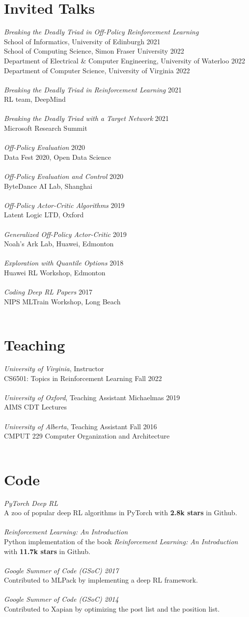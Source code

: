 \documentclass[margin, 10pt]{res} %
\newcommand*{\talk}[3]{{{\sl #2} \hfill #1 \\ #3 \\ \\}}
\newcommand*{\teaching}[4]{{{\sl #3}, #2 \hfill #1 \\ #4\\ \\}}
\newcommand*{\code}[2]{{{\sl #1} \\ #2 \\\\}}
\begin{document}
\begin{resume}
\section{Invited Talks}
\talk{}{Breaking the Deadly Triad in Off-Policy Reinforcement Learning}{School of Informatics, University of Edinburgh \hfill 2021 \\
School of Computing Science, Simon Fraser University \hfill 2022\\
Department of Electrical \& Computer Engineering, University of Waterloo \hfill 2022 \\
Department of Computer Science, University of Virginia \hfill 2022}
\talk{2021}{Breaking the Deadly Triad in Reinforcement Learning}{RL team, DeepMind}
\talk{2021}{Breaking the Deadly Triad with a Target Network}{Microsoft Research Summit}
\talk{2020}{Off-Policy Evaluation}{Data Fest 2020, Open Data Science}
\talk{2020}{Off-Policy Evaluation and Control}{ByteDance AI Lab, Shanghai}
\talk{2019}{Off-Policy Actor-Critic Algorithms}{Latent Logic LTD, Oxford}
\talk{2019}{Generalized Off-Policy Actor-Critic}{Noah's Ark Lab, Huawei, Edmonton}
\talk{2018}{Exploration with Quantile Options}{Huawei RL Workshop, Edmonton}
\talk{2017}{Coding Deep RL Papers}{NIPS MLTrain Workshop, Long Beach}

\section{Teaching}
\teaching{}{Instructor}{University of Virginia}{CS6501: Topics in Reinforcement Learning \hfill Fall 2022}
\teaching{Michaelmas 2019}{Teaching Assistant}{University of Oxford}{AIMS CDT Lectures}
\teaching{Fall 2016}{Teaching Assistant}{University of Alberta}{CMPUT 229 Computer Organization and Architecture}

\section{Code}
\code{PyTorch Deep RL}{A zoo of popular deep RL algorithms in PyTorch with \textbf{2.8k stars} in Github.}
\code{{Reinforcement Learning: An Introduction}}{Python implementation of the book \textit{Reinforcement Learning: An Introduction} \\ with \textbf{11.7k stars} in Github.}
\code{{Google Summer of Code (GSoC) 2017}}{Contributed to MLPack by implementing a deep RL framework.}
\code{{Google Summer of Code (GSoC) 2014}}{Contributed to Xapian by optimizing the post list and the position list.}


\end{resume}
\end{document}
